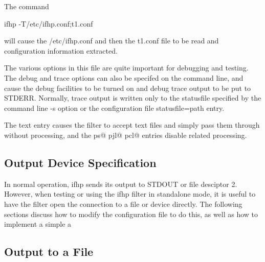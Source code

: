 \documentclass[a4paper]{article}
\begin{document}
The command
\begin{tscreen}
ifhp -T/etc/ifhp.conf;t1.conf
\end{tscreen}

will cause the
{\ttfamily /etc/ifhp.conf} and then the
{\ttfamily t1.conf} file to be read and configuration information extracted.

The various options in this file are quite important for debugging
and testing.
The
{\ttfamily debug}
and
{\ttfamily trace}
options can also be specifed on the command line,
and cause the debug facilities to be turned on and debug trace output
to be put to
{\ttfamily STDERR}.
Normally,
trace output is written only to the
{\ttfamily statusfile}
specified by the command line
{\ttfamily -s} option or the configuration file
{\ttfamily statusfile=path} entry.

The
{\ttfamily text} entry causes the filter to accept text files
and simply pass them through without processing,
and the
{\ttfamily ps@}
{\ttfamily pjl@}
{\ttfamily pcl@}
entries disable related processing.


\subsection{Output Device Specification}

In normal operation,
{\ttfamily ifhp}
sends its output to
{\ttfamily STDOUT} or file desciptor 2.
However,
when testing or using the
{\ttfamily ifhp}
filter in standalone mode,
it is useful to have the filter open the connection
to a file or device directly.
The following sections
discuss how to modify the configuration file to do this,
as well as how to implement a simple
a


\subsection{Output to a File}
\end{document}
